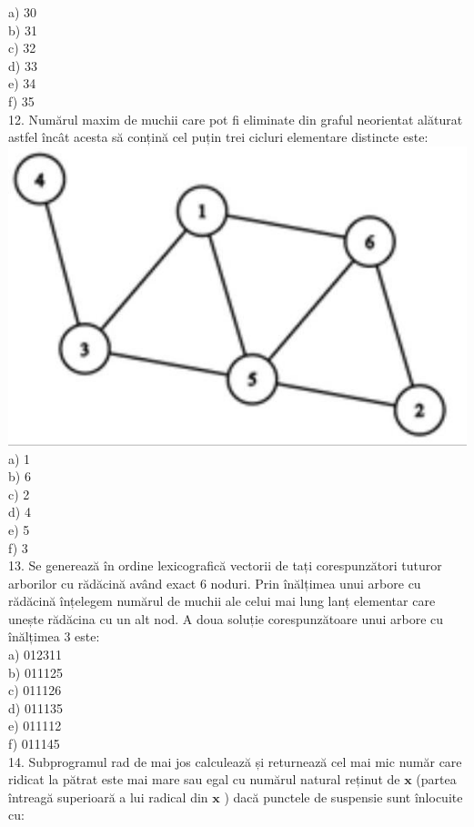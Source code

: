 \documentclass[10pt]{article}
\begin{document}
a) 30\\
b) 31\\
c) 32\\
d) 33\\
e) 34\\
f) 35\\
12. Numărul maxim de muchii care pot fi eliminate din graful neorientat alăturat astfel încât acesta să conțină cel puțin trei cicluri elementare distincte este:\\
\includegraphics[max width=\textwidth, center]{2025_04_17_46e04c6acd873ea9558dg-157}\\
a) 1\\
b) 6\\
c) 2\\
d) 4\\
e) 5\\
f) 3\\
13. Se generează în ordine lexicografică vectorii de tați corespunzători tuturor arborilor cu rădăcină având exact 6 noduri. Prin înălțimea unui arbore cu rădăcină înțelegem numărul de muchii ale celui mai lung lanț elementar care unește rădăcina cu un alt nod. A doua soluție corespunzătoare unui arbore cu înălțimea 3 este:\\
a) 012311\\
b) 011125\\
c) 011126\\
d) 011135\\
e) 011112\\
f) 011145\\
14. Subprogramul rad de mai jos calculează și returnează cel mai mic număr care ridicat la pătrat este mai mare sau egal cu numărul natural reținut de $\mathbf{x}$ (partea întreagă superioară a lui radical din $\mathbf{x}$ ) dacă punctele de suspensie sunt înlocuite cu:
\end{document}
